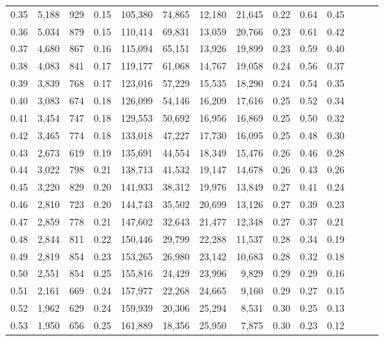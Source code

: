\begin{tabular}{rrrrrrrrrrrrrr}
0.35 &  5,188 &    929 &  0.15 &  105,380 &   74,865 &  12,180 &  21,645 &  0.22 &  0.64 &      0.45 \\
0.36 &  5,034 &    879 &  0.15 &  110,414 &   69,831 &  13,059 &  20,766 &  0.23 &  0.61 &      0.42 \\
0.37 &  4,680 &    867 &  0.16 &  115,094 &   65,151 &  13,926 &  19,899 &  0.23 &  0.59 &      0.40 \\
0.38 &  4,083 &    841 &  0.17 &  119,177 &   61,068 &  14,767 &  19,058 &  0.24 &  0.56 &      0.37 \\
0.39 &  3,839 &    768 &  0.17 &  123,016 &   57,229 &  15,535 &  18,290 &  0.24 &  0.54 &      0.35 \\
0.40 &  3,083 &    674 &  0.18 &  126,099 &   54,146 &  16,209 &  17,616 &  0.25 &  0.52 &      0.34 \\
0.41 &  3,454 &    747 &  0.18 &  129,553 &   50,692 &  16,956 &  16,869 &  0.25 &  0.50 &      0.32 \\
0.42 &  3,465 &    774 &  0.18 &  133,018 &   47,227 &  17,730 &  16,095 &  0.25 &  0.48 &      0.30 \\
0.43 &  2,673 &    619 &  0.19 &  135,691 &   44,554 &  18,349 &  15,476 &  0.26 &  0.46 &      0.28 \\
0.44 &  3,022 &    798 &  0.21 &  138,713 &   41,532 &  19,147 &  14,678 &  0.26 &  0.43 &      0.26 \\
0.45 &  3,220 &    829 &  0.20 &  141,933 &   38,312 &  19,976 &  13,849 &  0.27 &  0.41 &      0.24 \\
0.46 &  2,810 &    723 &  0.20 &  144,743 &   35,502 &  20,699 &  13,126 &  0.27 &  0.39 &      0.23 \\
0.47 &  2,859 &    778 &  0.21 &  147,602 &   32,643 &  21,477 &  12,348 &  0.27 &  0.37 &      0.21 \\
0.48 &  2,844 &    811 &  0.22 &  150,446 &   29,799 &  22,288 &  11,537 &  0.28 &  0.34 &      0.19 \\
0.49 &  2,819 &    854 &  0.23 &  153,265 &   26,980 &  23,142 &  10,683 &  0.28 &  0.32 &      0.18 \\
0.50 &  2,551 &    854 &  0.25 &  155,816 &   24,429 &  23,996 &   9,829 &  0.29 &  0.29 &      0.16 \\
0.51 &  2,161 &    669 &  0.24 &  157,977 &   22,268 &  24,665 &   9,160 &  0.29 &  0.27 &      0.15 \\
0.52 &  1,962 &    629 &  0.24 &  159,939 &   20,306 &  25,294 &   8,531 &  0.30 &  0.25 &      0.13 \\
0.53 &  1,950 &    656 &  0.25 &  161,889 &   18,356 &  25,950 &   7,875 &  0.30 &  0.23 &      0.12 \\

\end{tabular}
